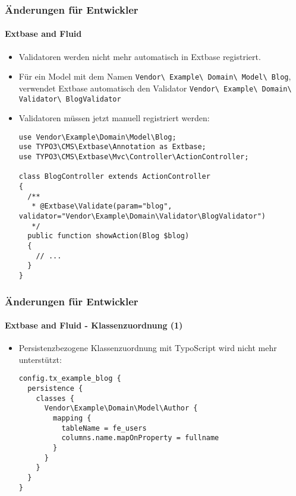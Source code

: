 \begin{frame}[fragile]
	\frametitle{Änderungen für Entwickler}
	\framesubtitle{Extbase and Fluid}

	\lstset{basicstyle=\tiny\ttfamily}

	\begin{itemize}
		\item Validatoren werden nicht mehr automatisch in Extbase registriert.
		\item Für ein Model mit dem Namen
			\small\texttt{Vendor\textbackslash
				Example\textbackslash
				Domain\textbackslash
				Model\textbackslash
				Blog}\normalsize,\newline
			verwendet Extbase automatisch den Validator
			\small\texttt{Vendor\textbackslash
				Example\textbackslash
				Domain\textbackslash
				Validator\textbackslash
				BlogValidator}\normalsize

		\item Validatoren müssen jetzt manuell registriert werden:

\begin{lstlisting}
use Vendor\Example\Domain\Model\Blog;
use TYPO3\CMS\Extbase\Annotation as Extbase;
use TYPO3\CMS\Extbase\Mvc\Controller\ActionController;

class BlogController extends ActionController
{
  /**
   * @Extbase\Validate(param="blog", validator="Vendor\Example\Domain\Validator\BlogValidator")
   */
  public function showAction(Blog $blog)
  {
    // ...
  }
}
\end{lstlisting}

	\end{itemize}

\end{frame}


\begin{frame}[fragile]
	\frametitle{Änderungen für Entwickler}
	\framesubtitle{Extbase and Fluid - Klassenzuordnung (1)}

	\lstset{basicstyle=\tiny\ttfamily}

	\begin{itemize}
		\item Persistenzbezogene Klassenzuordnung mit TypoScript wird nicht mehr unterstützt:

\begin{lstlisting}
config.tx_example_blog {
  persistence {
    classes {
      Vendor\Example\Domain\Model\Author {
        mapping {
          tableName = fe_users
          columns.name.mapOnProperty = fullname
        }
      }
    }
  }
}
\end{lstlisting}

	\end{itemize}

\end{frame}

